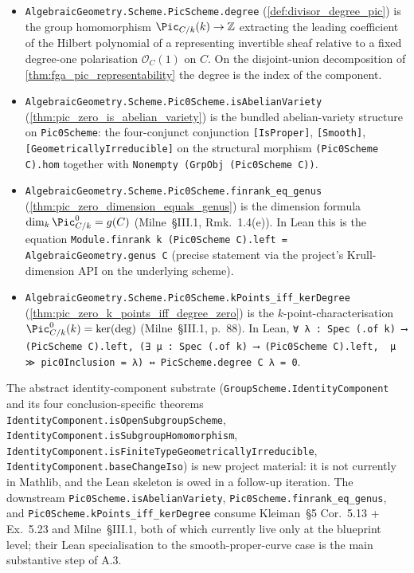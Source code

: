 \begin{itemize}
    \cref{thm:pic_is_group_scheme}.
  \item \texttt{AlgebraicGeometry.Scheme.PicScheme.degree}
    (\cref{def:divisor_degree_pic}) is the group homomorphism
    \(\Pic_{C/k}(k) \to \mathbb{Z}\) extracting the leading coefficient
    of the Hilbert polynomial of a representing invertible sheaf
    relative to a fixed degree-one polarisation \(\mathcal{O}_C(1)\) on
    \(C\). On the disjoint-union decomposition of
    \cref{thm:fga_pic_representability} the degree is the index of the
    component.
  \item \texttt{AlgebraicGeometry.Scheme.Pic0Scheme.isAbelianVariety}
    (\cref{thm:pic_zero_is_abelian_variety}) is the bundled
    abelian-variety structure on \texttt{Pic0Scheme}: the four-conjunct
    conjunction \texttt{[IsProper]}, \texttt{[Smooth]},
    \texttt{[GeometricallyIrreducible]} on the structural morphism
    \texttt{(Pic0Scheme C).hom} together with
    \texttt{Nonempty (GrpObj (Pic0Scheme C))}.
  \item \texttt{AlgebraicGeometry.Scheme.Pic0Scheme.finrank_eq_genus}
    (\cref{thm:pic_zero_dimension_equals_genus}) is the dimension
    formula \(\dim_k \Pic^0_{C/k} = g(C)\) (Milne~\S III.1,
    Rmk.~1.4(e)). In Lean this is the equation
    \texttt{Module.finrank k (Pic0Scheme C).left = AlgebraicGeometry.genus C}
    (precise statement via the project's Krull-dimension API on the
    underlying scheme).
  \item \texttt{AlgebraicGeometry.Scheme.Pic0Scheme.kPoints_iff_kerDegree}
    (\cref{thm:pic_zero_k_points_iff_degree_zero}) is the
    \(k\)-point-characterisation
    \(\Pic^0_{C/k}(k) = \ker(\deg)\) (Milne~\S III.1, p.~88). In Lean,
    \texttt{∀ λ : Spec (.of k) ⟶ (PicScheme C).left,
    (∃ μ : Spec (.of k) ⟶ (Pic0Scheme C).left,\,
    μ ≫ pic0Inclusion = λ) ↔ PicScheme.degree C λ = 0}.
\end{itemize}

The abstract identity-component substrate
(\texttt{GroupScheme.IdentityComponent} and its four
conclusion-specific theorems
\texttt{IdentityComponent.isOpenSubgroupScheme},
\texttt{IdentityComponent.isSubgroupHomomorphism},
\texttt{IdentityComponent.isFiniteTypeGeometricallyIrreducible},
\texttt{IdentityComponent.baseChangeIso}) is new project material: it
is not currently in Mathlib, and the Lean skeleton is owed in a
follow-up iteration. The downstream
\texttt{Pic0Scheme.isAbelianVariety},
\texttt{Pic0Scheme.finrank\_eq\_genus}, and
\texttt{Pic0Scheme.kPoints\_iff\_kerDegree} consume Kleiman~\S 5
Cor.~5.13 + Ex.~5.23 and Milne~\S III.1, both of which currently
live only at the blueprint level; their Lean specialisation to the
smooth-proper-curve case is the main substantive step of A.3.

